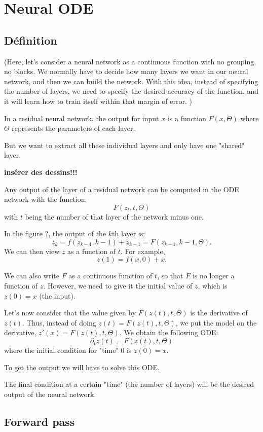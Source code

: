 \documentclass[10pt,a4paper]{article}
\theoremstyle{definition}
\theoremstyle{definition}
\begin{document}
\section{Neural ODE}

\subsection{Définition}

(Here, let's consider a neural network as a continuous function with no grouping, no blocks.   We normally have to decide how many layers we want in our neural network, and then we can build the network. With this idea, instead of specifying the number of layers, we need to specify the desired accuracy of the function, and it will learn how to train itself within that margin of error. )

In a residual neural network, the output for input $x$ is a function $F(x, \Theta)$ where $\Theta$ represents the parameters of each layer. 

But we want to extract all these individual layers and only have one "shared" layer.

\textbf{insérer des dessins!!!}

Any output of the layer of a residual network can be computed in the ODE network with the function:
$$F(z_t, t, \Theta)$$
with $t$ being the number of that layer of the network minus one.

In the figure ?, the output of the $k$th layer is:
$$z_k = f(z_{k-1}, k-1) + z_{k-1} = F(z_{k-1}, k-1, \Theta).$$
We can then view $z$ as a function of $t$. For example,
$$z(1) = f(x, 0) + x.$$

We can also write $F$ as a continuous function of $t$, so that $F$ is no longer a function of $z$. However, we need to give it the initial value of $z$, which is $z(0) = x$ (the input).

Let's now consider that the value given by $F(z(t), t, \Theta)$ is the derivative of $z(t)$. Thus, instead of doing $z(t) = F(z(t), t, \Theta)$, we put the model on the derivative, $z'(x) = F(z(t), t, \Theta)$.  We obtain the following ODE:
$$ \partial_t z(t) = F(z(t), t, \Theta) $$
where the initial condition for "time" $0$ is $z(0) = x$. 

To get the output we will have to solve this ODE.

The final condition at a certain "time" (the number of layers) will be the desired output of the neural network.


\subsection{Forward pass}
\end{document}
